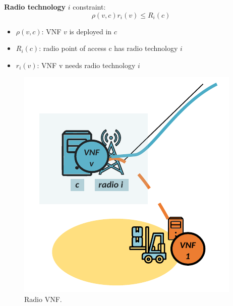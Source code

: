 \documentclass[aspectratio=169]{beamer}
\begin{document}
\begin{frame}
    \frametitle{\secname}
    \framesubtitle{\subsecname}

    \begin{minipage}{0.5\textwidth}
        \textbf{Radio technology} $i$ constraint:
        \begin{equation}
            \rho(v , c)r_i (v) \le R_i (c)
            \label{eq:okpi-radio-constraint}
        \end{equation}
        \begin{itemize}
            \item $\rho(v,c)$: VNF $v$ is deployed in $c$ 
            \item $R_i (c)$: radio point of access c has radio technology $i$
            \item $r_i (v)$: VNF v needs radio technology $i$
        \end{itemize}
    \end{minipage}
    \begin{minipage}{0.45\textwidth}
        \begin{figure}
            \centering
            \includegraphics[width=.9\textwidth]{img/okpi-radio.pdf}
            \caption{Radio VNF.}
        \end{figure}
    \end{minipage}
\end{frame}
\end{document}
